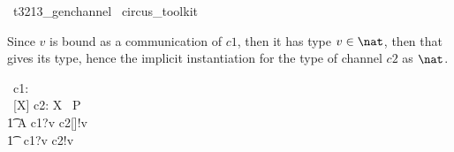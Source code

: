 
\begin{zsection}
  \SECTION\ t3213\_genchannel \parents\ circus\_toolkit
\end{zsection}

Since $v$ is bound as a communication of $c1$, then it has
type $v \in \nat$, then that gives its type, hence the implicit
instantiation for the type of channel $c2$ as $\nat$.
\begin{circus}
     \circchannel\ c1: \nat \\
     \circchannel\ [X] c2: X  
     \also
     \circprocess\ P \circdef\ \circbegin \\
       \t1 A \circdef c1?v \then c2[\nat]!v \then \Skip \\
     	\t1 \circspot\ c1?v \then c2!v \then \Skip \\	
     \circend
\end{circus}
